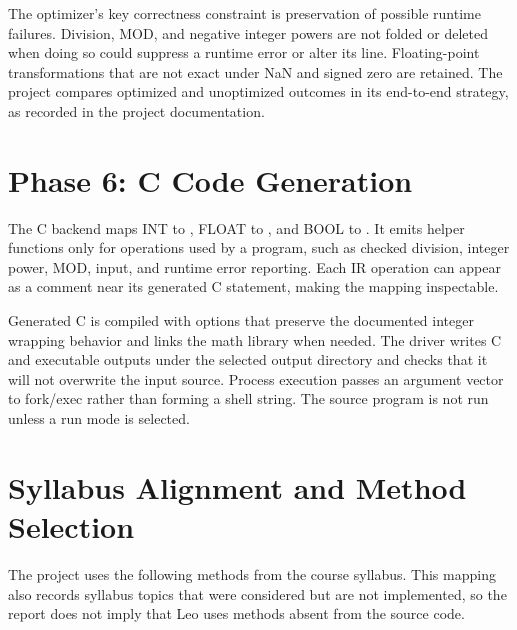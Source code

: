 \documentclass[12pt,a4paper,oneside]{report}
\newcommand{\code}[1]{\texttt{\detokenize{#1}}}
\begin{document}
The optimizer's key correctness constraint is preservation of possible runtime failures. Division, MOD, and negative integer powers are not folded or deleted when doing so could suppress a runtime error or alter its line. Floating-point transformations that are not exact under NaN and signed zero are retained. The project compares optimized and unoptimized outcomes in its end-to-end strategy, as recorded in the project documentation.

\section{Phase 6: C Code Generation}
The C backend maps INT to \code{long long}, FLOAT to \code{double}, and BOOL to \code{int}. It emits helper functions only for operations used by a program, such as checked division, integer power, MOD, input, and runtime error reporting. Each IR operation can appear as a comment near its generated C statement, making the mapping inspectable.

Generated C is compiled with options that preserve the documented integer wrapping behavior and links the math library when needed. The driver writes C and executable outputs under the selected output directory and checks that it will not overwrite the input source. Process execution passes an argument vector to fork/exec rather than forming a shell string. The source program is not run unless a run mode is selected.

\section{Syllabus Alignment and Method Selection}
The project uses the following methods from the course syllabus. This mapping also records syllabus topics that were considered but are not implemented, so the report does not imply that Leo uses methods absent from the source code.
\end{document}
